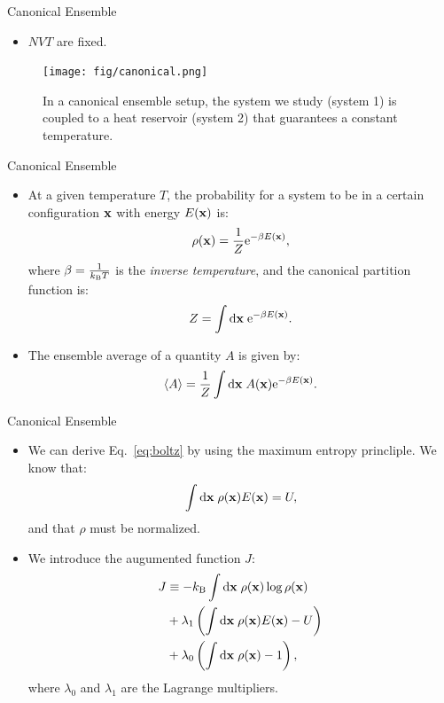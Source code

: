 \documentclass[10pt]{beamer}
\begin{document}
\begin{frame}{Canonical Ensemble}
\begin{itemize}
\setlength\itemsep{1em}
  \item $NVT$ are fixed.
\end{itemize}
\begin{figure}
\centering
  \texttt{[image: fig/canonical.png]}
  \caption{In a canonical ensemble setup, the system we study (system 1) is coupled to a heat reservoir (system 2) that guarantees a constant temperature.}
\end{figure}
\end{frame}

\begin{frame}{Canonical Ensemble}
\begin{itemize}
\setlength\itemsep{1em}
  \item At a given temperature $T$, the probability for a system to be in a certain configuration ${\bf x}$ with energy $E({\bf x})$ is:
  \begin{equation}
  \label{eq:boltz}
    \rho({\bf x}) = \frac{1}{Z} \mathrm{e}^{-\beta E({\bf x})},
  \end{equation}
  where $\beta = \frac{1}{k_\mathrm{B}T}$ is the \textit{inverse temperature}, and the canonical partition function is:
  \begin{equation}
    Z = \int\mathrm{d}{\bf x}\; \mathrm{e}^{-\beta E({\bf x})}.
  \end{equation}

  \item The ensemble average of a quantity $A$ is given by:
  \begin{equation}
    \left< A \right> = \frac{1}{Z} \int\mathrm{d}{\bf x}\; A({\bf x}) \mathrm{e}^{-\beta E({\bf x})}.
  \end{equation}
\end{itemize}
\end{frame}

\begin{frame}{Canonical Ensemble}
\begin{itemize}
\setlength\itemsep{1em}
  \item We can derive Eq.~\ref{eq:boltz} by using the maximum entropy princliple. We know that:
  \begin{equation}
    \int\mathrm{d}{\bf x}\;\rho({\bf x}) E({\bf x}) = U,
  \end{equation}
  and that $\rho$ must be normalized.

  \item We introduce the augumented function $J$:
  \begin{align}
    J &\equiv -k_\mathrm{B}\int\mathrm{d}{\bf x}\;\rho({\bf x})\log\rho({\bf x}) \\ &+ \lambda_1 \left(\int\mathrm{d}{\bf x}\;\rho({\bf x})E({\bf x}) - U\right) \\ &+ \lambda_0 \left(\int\mathrm{d}{\bf x}\;\rho({\bf x}) - 1\right),
  \end{align}
  where $\lambda_0$ and $\lambda_1$ are the Lagrange multipliers.
\end{itemize}
\end{frame}
\end{document}
